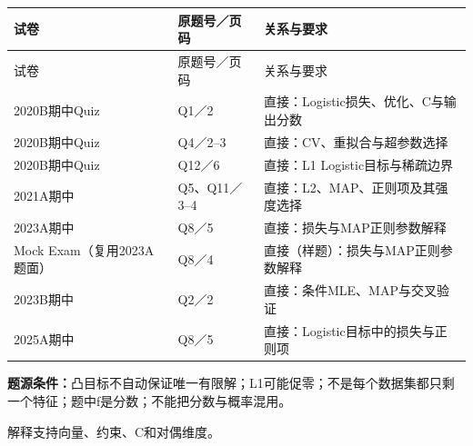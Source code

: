 \begingroup\small\setlength{\tabcolsep}{3pt}\renewcommand{\arraystretch}{1.22}
\begin{longtable}{@{}>{\raggedright\arraybackslash}p{}>{\raggedright\arraybackslash}p{}>{\raggedright\arraybackslash}p{}@{}}
\toprule
试卷 & 原题号／页码 & 关系与要求 \\
\midrule\endfirsthead
试卷 & 原题号／页码 & 关系与要求 \\
\midrule\endhead
\bottomrule\endfoot
2020B期中Quiz & Q1／2 & 直接：Logistic损失、优化、C与输出分数 \\
2020B期中Quiz & Q4／2–3 & 直接：CV、重拟合与超参数选择 \\
2020B期中Quiz & Q12／6 & 直接：L1 Logistic目标与稀疏边界 \\
2021A期中 & Q5、Q11／3–4 & 直接：L2、MAP、正则项及其强度选择 \\
2023A期中 & Q8／5 & 直接：损失与MAP正则参数解释 \\
Mock Exam（复用2023A题面） & Q8／4 & 直接（样题）：损失与MAP正则参数解释 \\
2023B期中 & Q2／2 & 直接：条件MLE、MAP与交叉验证 \\
2025A期中 & Q8／5 & 直接：Logistic目标中的损失与正则项 \\
\end{longtable}\endgroup

\textbf{题源条件：}凸目标不自动保证唯一有限解；L1可能促零；不是每个数据集都只剩一个特征；题中f是分数；不能把分数与概率混用。



解释支持向量、约束、C和对偶维度。

